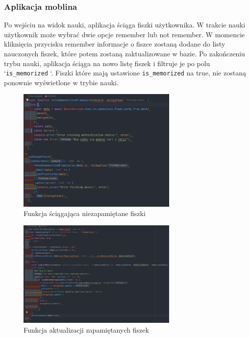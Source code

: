 \subsubsection{Aplikacja moblina}

Po wejściu na widok nauki, aplikacja ściąga fiszki użytkownika. W trakcie nauki użytkownik może wybrać dwie opcje remember lub not remember. W momencie kliknięcia przycisku remember informacje o fiszce zostaną dodane do listy nauczonych fiszek, które potem zostaną zaktualizowane w bazie. Po zakończeniu trybu nauki, aplikacja ściąga na nowo listę fiszek i filtruje je po polu ‘\texttt{is_memorized} ‘. Fiszki które mają ustawione \texttt{is_memorized} na true, nie zostaną ponownie wyświetlone w trybie nauki.

\begin{figure}[H]
    \centering
    \includegraphics[width=0.7\textwidth]{chapters/chapter_8/screens/get_unmemorized_flash_cards_mobile}
    \caption{Funkcja ściągająca niezapamiętane fiszki}
    \label{img:get_unmemorized_flash_cards_mobile}
\end{figure}

\begin{figure}[H]
    \centering
    \includegraphics[width=0.7\textwidth]{chapters/chapter_8/screens/update_unmemorized_flash_cards_mobile}
    \caption{Funkcja aktualizacji zapamiętanych fiszek}
    \label{img:update_unmemorized_flash_cards_mobile}
\end{figure}

